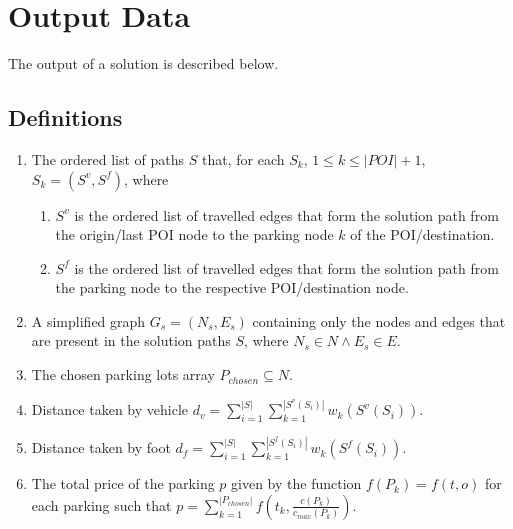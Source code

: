 \documentclass[a4paper, 12pt]{report}
\begin{document}
    \pagebreak

    \section{Output Data} \label{odata}
    
    The output of a solution is described below.
    
    \subsection{Definitions}
    
    \begin{enumerate}
        \item The ordered list of paths $S$ that, for each $S_k$, $1 \leqslant k \leqslant |POI|+1$, $S_k = (S^v, S^f)$, where
        \begin{enumerate}
            \item $S^v$ is the ordered list of travelled edges that form the solution path from the origin/last POI node to the parking node $k$ of the POI/destination.
            \item $S^f$ is the ordered list of travelled edges that form the solution path from the parking node to the respective POI/destination node.
        \end{enumerate}
        \item A simplified graph $G_s = (N_s,E_s)$ containing only the nodes and edges that are present in the solution paths $S$, where $N_s \in N \land E_s \in E$.
        \item The chosen parking lots array $P_{chosen} \subseteq N$.
        \item Distance taken by vehicle $ \displaystyle d_{v} = \sum_{i=1}^{|S|}\sum_{k=1}^{|S^v(S_i)|} w_k(S^v(S_i))$.
        \item Distance taken by foot $ \displaystyle d_{f} = \sum_{i=1}^{|S|}\sum_{k=1}^{|S^f(S_i)|} w_k(S^f(S_i))$.
        \item The total price of the parking $p$ given by the function $f(P_{k}) = f(t,o)$ for each parking such that $ \displaystyle p = \sum_{k=1}^{|P_{chosen}|} f(t_k, \frac{c(P_{k} )}{c_{max}(P_{k})})$.
    \end{enumerate}
\end{document}

